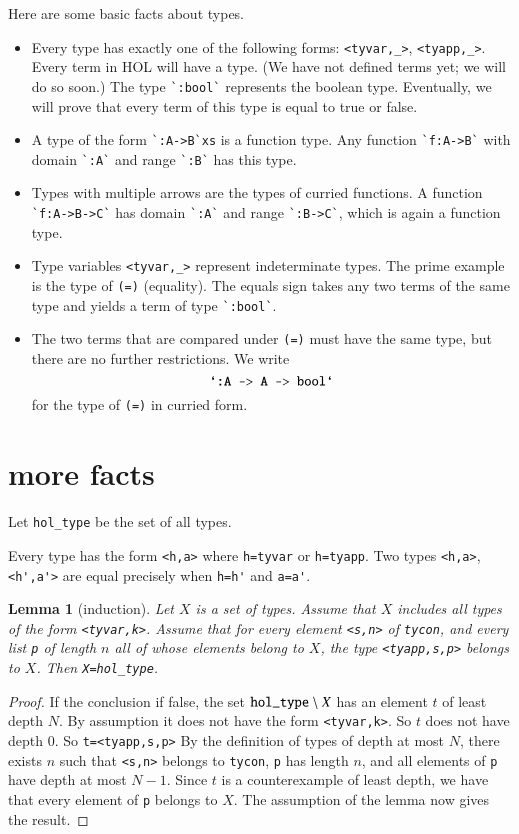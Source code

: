 \documentclass[cup9a]{cupbook}
\newtheorem{lemma}{Lemma}[chapter]
\begin{document}
Here are some basic facts about types.
\begin{itemize}
\item Every type has exactly one of the following forms:
\verb!<tyvar,_>!, \verb!<tyapp,_>!.
Every term in HOL will have a type. (We have not defined terms yet; we will do so soon.)
The type \verb!`:bool`! represents the boolean type.  Eventually, we will prove that every term of this type is equal to true or false.
\item A type of the form \verb!`:A->B`xs! is a function type.  Any function \verb!`f:A->B`! with domain \verb!`:A`! and range \verb!`:B`! has this type.
\item Types with multiple arrows are the types of curried functions.  A function \verb!`f:A->B->C`! has domain \verb!`:A`! and range \verb!`:B->C`!, which is again a function type.
\item Type variables \verb!<tyvar,_>! represent indeterminate types.   The prime example is the type of \verb!(=)! (equality).  The equals sign takes any two terms of the same type and yields a term of type \verb!`:bool`!.
\item The two terms that are compared under \verb!(=)! must have the same type, but there are no further restrictions.  We write
$$
\verb!`:A -> A -> bool`!
$$
for the type of \verb!(=)! in curried form.
\end{itemize}



\section{more facts}

Let \verb!hol_type! be the set of all types.

Every type has the form \verb!<h,a>! where \verb!h=tyvar! or \verb!h=tyapp!.  Two types \verb!<h,a>!, \verb!<h',a'>! are equal precisely when \verb!h=h'! and \verb!a=a'!.

\begin{lemma}[induction]  Let $X$ is a set of types. Assume that $X$ includes all types of the form \verb!<tyvar,k>!.  Assume that for every element \verb!<s,n>! of \verb!tycon!, and every list \verb!p! of length $n$ all of whose elements belong to $X$, the type \verb!<tyapp,s,p>! belongs to $X$.  Then \verb!X=hol_type!.
\end{lemma}

\begin{proof} If the conclusion if false, the set $\verb!hol_type!\setminus X$ has an element $t$ of least depth $N$.  By assumption it does not have the form \verb!<tyvar,k>!.  So $t$ does not have depth $0$.  So \verb!t=<tyapp,s,p>!   By the definition of types of depth at most $N$, there exists $n$ such that \verb!<s,n>! belongs to \verb!tycon!, \verb!p! has length $n$, and all elements of \verb!p! have depth at most $N-1$.  Since $t$ is a counterexample of least depth, we have that every element of \verb!p! belongs to $X$.  The assumption of the lemma now gives the result.
\end{proof}
\end{document}
